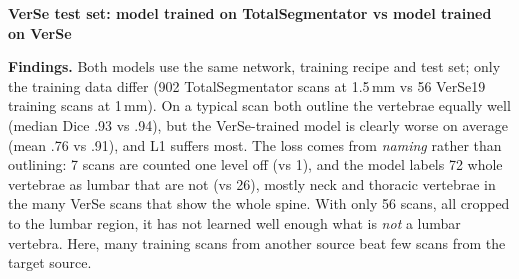\documentclass[10pt,a4paper]{article}
\begin{document}
\small

{\sffamily\bfseries\large VerSe test set: model trained on TotalSegmentator vs model trained on VerSe}



\textbf{Findings.} Both models use the same network, training recipe and test set; only the training data
differ (902 TotalSegmentator scans at 1.5\,mm vs 56 VerSe19 training scans at 1\,mm). On a typical scan
both outline the vertebrae equally well (median Dice .93 vs .94), but the VerSe-trained model is clearly
worse on average (mean .76 vs .91), and L1 suffers most. The loss comes from \emph{naming} rather than
outlining: 7 scans are counted one level off (vs 1), and the model labels 72 whole vertebrae as lumbar that
are not (vs 26), mostly neck and thoracic vertebrae in the many VerSe scans that show the whole spine. With
only 56 scans, all cropped to the lumbar region, it has not learned well enough what is \emph{not} a lumbar
vertebra. Here, many training scans from another source beat few scans from the target source.
\end{document}
